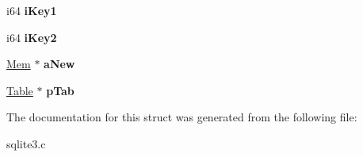 \begin{DoxyCompactItemize}
\item 
i64 {\bfseries i\+Key1}\hypertarget{structPreUpdate_a1d05fbd13495324e507658cd519cacbd}{}\label{structPreUpdate_a1d05fbd13495324e507658cd519cacbd}

\item 
i64 {\bfseries i\+Key2}\hypertarget{structPreUpdate_adeecdda5c18124870ad08b70832f7387}{}\label{structPreUpdate_adeecdda5c18124870ad08b70832f7387}

\item 
\hyperlink{structMem}{Mem} $\ast$ {\bfseries a\+New}\hypertarget{structPreUpdate_a3d8862bac16113aeb528b1aeafe4f118}{}\label{structPreUpdate_a3d8862bac16113aeb528b1aeafe4f118}

\item 
\hyperlink{structTable}{Table} $\ast$ {\bfseries p\+Tab}\hypertarget{structPreUpdate_a6e7848e9ef889f2dc47f68a5a2a0ed4a}{}\label{structPreUpdate_a6e7848e9ef889f2dc47f68a5a2a0ed4a}

\end{DoxyCompactItemize}


The documentation for this struct was generated from the following file\+:\begin{DoxyCompactItemize}
\item 
sqlite3.\+c\end{DoxyCompactItemize}

